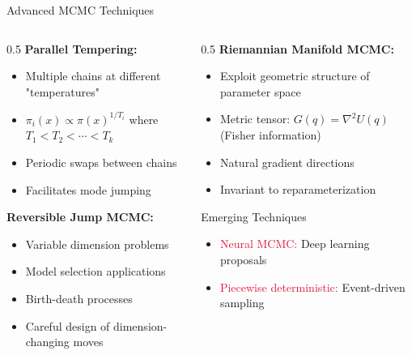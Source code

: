 \documentclass[aspectratio=169,11pt]{beamer}
\begin{document}
\begin{frame}{Advanced MCMC Techniques}
\begin{columns}
\begin{column}{0.5\textwidth}
\textbf{Parallel Tempering:}
\begin{itemize}
\item Multiple chains at different "temperatures"
\item $\pi_i(x) \propto \pi(x)^{1/T_i}$ where $T_1 < T_2 < \cdots < T_k$
\item Periodic swaps between chains
\item Facilitates mode jumping
\end{itemize}

\vspace{0.3cm}
\textbf{Reversible Jump MCMC:}
\begin{itemize}
\item Variable dimension problems
\item Model selection applications
\item Birth-death processes
\item Careful design of dimension-changing moves
\end{itemize}
\end{column}
\begin{column}{0.5\textwidth}
\textbf{Riemannian Manifold MCMC:}
\begin{itemize}
\item Exploit geometric structure of parameter space
\item Metric tensor: $G(q) = \nabla^2 U(q)$ (Fisher information)
\item Natural gradient directions
\item Invariant to reparameterization
\end{itemize}

\vspace{0.3cm}
\begin{block}{Emerging Techniques}
\begin{itemize}
\item \textcolor{crimson}{Neural MCMC:} Deep learning proposals
\item \textcolor{crimson}{Piecewise deterministic:} Event-driven sampling
\end{itemize}
\end{block}
\end{column}
\end{columns}
\end{frame}
\end{document}
